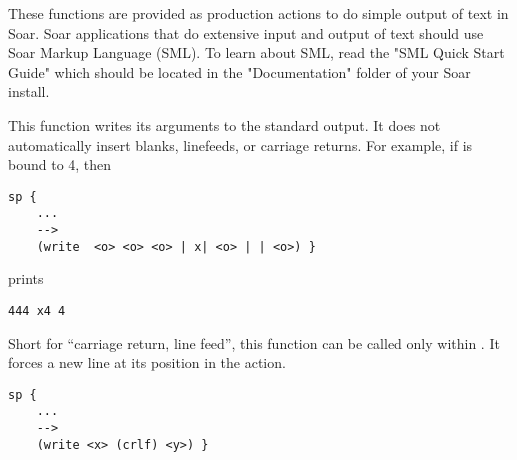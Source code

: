 These functions are provided as production actions to do simple output of text in Soar. Soar applications that do extensive input and output of text should use Soar Markup Language (SML). To learn about SML, read the "SML Quick Start Guide" which should be located in the "Documentation"  folder of your Soar install.

 
\begin{description}
\item [\soarb{write} --- ] This function writes its arguments to the standard
        output. It does not automatically insert blanks, linefeeds, or carriage
        returns.  For example, if  is bound to 4, then
\begin{verbatim}
sp {
    ...
    -->
    (write  <o> <o> <o> | x| <o> | | <o>) }
\end{verbatim}

prints

\begin{verbatim}
444 x4 4
\end{verbatim}

\item [\soarb{crlf} --- ] Short for ``carriage return, line feed'', this
        function can be called only within . It forces a new line
        at its position in the  action. 
\begin{verbatim}
sp {
    ...
    -->
    (write <x> (crlf) <y>) }
\end{verbatim}





\end{description}
